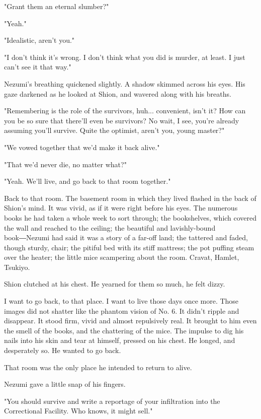 "Grant them an eternal slumber?"

"Yeah."

"Idealistic, aren't you."

"I don't think it's wrong. I don't think what you did is murder, at
least. I just can't see it that way."

Nezumi's breathing quickened slightly. A shadow skimmed across his eyes.
His gaze darkened as he looked at Shion, and wavered along with his
breaths.

"Remembering is the role of the survivors, huh... convenient, isn't it?
How can you be so sure that there'll even be survivors? No wait, I see,
you're already assuming you'll survive. Quite the optimist, aren't you,
young master?"

"We vowed together that we'd make it back alive."

"That we'd never die, no matter what?"

"Yeah. We'll live, and go back to that room together."

Back to that room. The basement room in which they lived flashed in the
back of Shion's mind. It was vivid, as if it were right before his eyes.
The numerous books he had taken a whole week to sort through; the
bookshelves, which covered the wall and reached to the ceiling; the
beautiful and lavishly-bound book―Nezumi had said it was a story of a
far-off land; the tattered and faded, though sturdy, chair; the pitiful
bed with its stiff mattress; the pot puffing steam over the heater; the
little mice scampering about the room. Cravat, Hamlet, Tsukiyo.

Shion clutched at his chest. He yearned for them so much, he felt dizzy.

I want to go back, to that place. I want to live those days once more.
Those images did not shatter like the phantom vision of No. 6. It didn't
ripple and disappear. It stood firm, vivid and almost repulsively real.
It brought to him even the smell of the books, and the chattering of the
mice. The impulse to dig his nails into his skin and tear at himself,
pressed on his chest. He longed, and desperately so. He wanted to go
back.

That room was the only place he intended to return to alive.

Nezumi gave a little snap of his fingers.

"You should survive and write a reportage of your infiltration into the
Correctional Facility. Who knows, it might sell."

